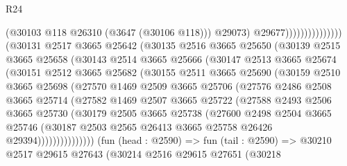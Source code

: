 \begin{lexlean}{R24}
\begin{coremodule}
                                        (@30103 @118 @26310 (@3647 (@30106 @118)))
                                        @29073)
                                      @29677)))))))))))))))
        (@30131
          @2517
          @3665
          @25642
          (@30135
            @2516
            @3665
            @25650
            (@30139
              @2515
              @3665
              @25658
              (@30143
                @2514
                @3665
                @25666
                (@30147
                  @2513
                  @3665
                  @25674
                  (@30151
                    @2512
                    @3665
                    @25682
                    (@30155
                      @2511
                      @3665
                      @25690
                      (@30159
                        @2510
                        @3665
                        @25698
                        (@27570
                          @1469
                          @2509
                          @3665
                          @25706
                          (@27576
                            @2486
                            @2508
                            @3665
                            @25714
                            (@27582
                              @1469
                              @2507
                              @3665
                              @25722
                              (@27588
                                @2493
                                @2506
                                @3665
                                @25730
                                (@30179
                                  @2505
                                  @3665
                                  @25738
                                  (@27600
                                    @2498
                                    @2504
                                    @3665
                                    @25746
                                    (@30187
                                      @2503
                                      @2565
                                      @26413
                                      @3665
                                      @25758
                                      @26426
                                      @29394)))))))))))))))
        (fun (head : @2590) =>
        fun (tail : @2590) =>
        @30210
          @2517
          @29615
          @27643
          (@30214
            @2516
            @29615
            @27651
            (@30218

\end{coremodule}
\end{lexlean}
